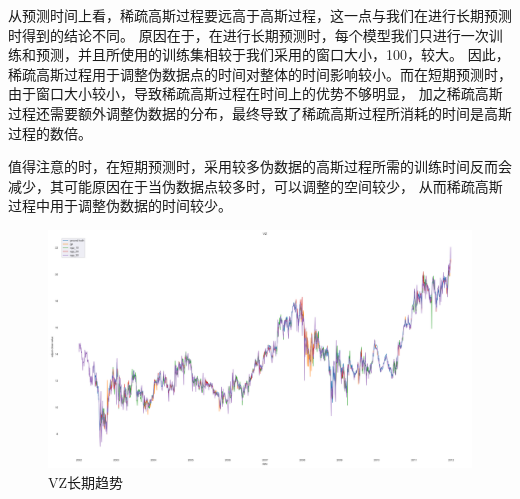 从预测时间上看，稀疏高斯过程要远高于高斯过程，这一点与我们在进行长期预测时得到的结论不同。
原因在于，在进行长期预测时，每个模型我们只进行一次训练和预测，并且所使用的训练集相较于我们采用的窗口大小，100，较大。
因此，稀疏高斯过程用于调整伪数据点的时间对整体的时间影响较小。而在短期预测时，由于窗口大小较小，导致稀疏高斯过程在时间上的优势不够明显，
加之稀疏高斯过程还需要额外调整伪数据的分布，最终导致了稀疏高斯过程所消耗的时间是高斯过程的数倍。

值得注意的时，在短期预测时，采用较多伪数据的高斯过程所需的训练时间反而会减少，其可能原因在于当伪数据点较多时，可以调整的空间较少，
从而稀疏高斯过程中用于调整伪数据的时间较少。

\begin{figure}[!htbp]
    \centering
    \includegraphics[width=\textwidth]{images/lab3/VZ_trend.png}
    \caption{VZ长期趋势}\label{3lab3VZtrend}
\end{figure}

